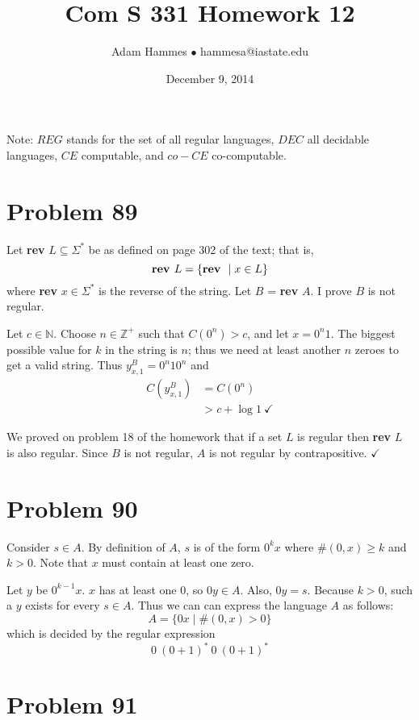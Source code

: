 \documentclass[11pt]{article}
\begin{document}
\title{Com S 331 Homework 12}
\author{Adam Hammes $\bullet$ hammesa@iastate.edu}
\date{December 9, 2014}
\maketitle

Note: $REG$ stands for the set of all regular languages, $DEC$ all decidable languages, $CE$ computable, and $co-CE$ co-computable.


\section*{Problem 89}

Let \textbf{rev} $L \subseteq \Sigma^*$ be as defined on page 302 of the text; that is,
	\[\text{\textbf{rev }} L = \{\text{\textbf{rev }} \mid x \in L\}\]
where \textbf{rev} $x \in \Sigma^*$ is the reverse of the string. Let $B$ = \textbf{rev} $A$.
I prove $B$ is not regular.

Let $c \in \mathbb{N}$.
Choose $n \in \mathbb{Z}^+$ such that $C(0^n) > c$, and let $x = 0^n1$.
The biggest possible value for $k$ in the string is $n$; thus we need at least another $n$ zeroes to get a valid string.
Thus $y^{B} _{x,1} = 0^n10^n$ and 
	\begin{align*}
		C( y^{B} _{x,1} ) &= C( 0^n) \\
		&> c + \log 1\ \checkmark
	\end{align*}

We proved on problem 18 of the homework that if a set $L$ is regular then \textbf{rev} $L$ is also regular.
Since $B$ is not regular, $A$ is not regular by contrapositive. $\checkmark$


\section*{Problem 90}

Consider $s \in A$.
By definition of $A$, $s$ is of the form $0^kx$ where $\#(0,x) \geq k$ and $k>0$.
Note that $x$ must contain at least one zero.

Let $y$ be $0^{k-1}x$. $x$ has at least one 0, so $0y \in A$.
Also, $0y = s$.
Because $k >0$, such a $y$ exists for every $s \in A$.
Thus we can can express the language $A$ as follows:
	\[ A = \{0x \mid \#(0,x) > 0 \}\]
which is decided by the regular expression
	\[ 0\ (0+1)^*\ 0\ (0+1)^*\]


\section*{Problem 91}
\end{document}
